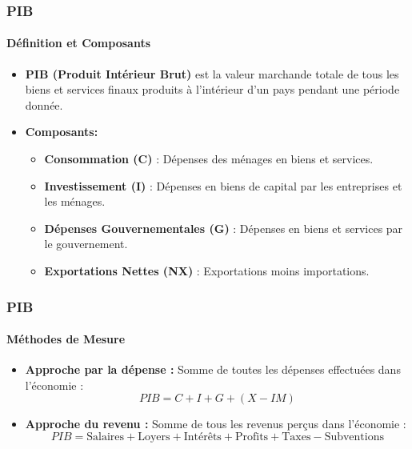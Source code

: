 \documentclass{beamer}
\begin{document}
\begin{frame}
    \frametitle{PIB}
    \framesubtitle{Définition et Composants}
        \begin{itemize}
            \item \textbf{PIB (Produit Intérieur Brut)} est la valeur marchande totale de tous les biens et services finaux produits à l'intérieur d'un pays pendant une période donnée.
            \item \textbf{Composants:}
                \begin{itemize}
                    \item \textbf{Consommation (C)} : Dépenses des ménages en biens et services.
                    \item \textbf{Investissement (I)} : Dépenses en biens de capital par les entreprises et les ménages.
                    \item \textbf{Dépenses Gouvernementales (G)} : Dépenses en biens et services par le gouvernement.
                    \item \textbf{Exportations Nettes (NX)} : Exportations moins importations.
                \end{itemize}
        \end{itemize}
\end{frame}
                
\begin{frame}
    \frametitle{PIB}
    \framesubtitle{Méthodes de Mesure}
        \begin{itemize}
            \item \textbf{Approche par la dépense :} Somme de toutes les dépenses effectuées dans l'économie :
                \begin{equation}
                PIB = C + I + G + (X - IM)
                \end{equation}
            \item \textbf{Approche du revenu :} Somme de tous les revenus perçus dans l'économie :
                \begin{equation}
                PIB = \text{Salaires} + \text{Loyers} + \text{Intérêts} + \text{Profits} + \text{Taxes} - \text{Subventions}
                \end{equation}
        \end{itemize}
\end{frame}
\end{document}
